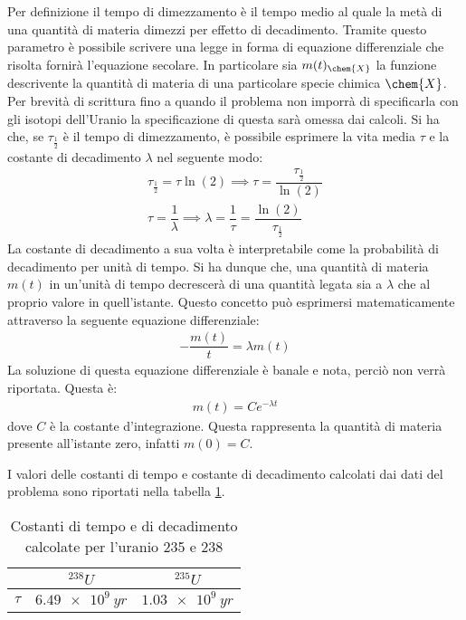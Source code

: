 \documentclass[../main.tex]{subfiles}
\begin{document}
\begin{svol}
		Per definizione il tempo di dimezzamento è il tempo medio al quale la metà di una quantità di materia dimezzi per effetto di decadimento. Tramite questo parametro è possibile scrivere una legge in forma di equazione differenziale che risolta fornirà l'equazione secolare. In particolare sia $ m(t)_{\chem{X}} $ la funzione descrivente la quantità di materia di una particolare specie chimica $ \chem{X} $. Per brevità di scrittura fino a quando il problema non imporrà di specificarla con gli isotopi dell'Uranio la specificazione di questa sarà omessa dai calcoli. Si ha che, se $ \tau_{\frac{1}{2}} $ è il tempo di dimezzamento, è possibile esprimere la vita media $ \tau $ e la costante di decadimento $ \lambda $ nel seguente modo:
		\begin{gather}
		\tau_{\frac{1}{2}}=\tau\ln(2) \implies \tau = \dfrac{\tau_{\frac{1}{2}}}{\ln(2)} \\
		\tau = \dfrac{1}{\lambda} \implies \lambda = \dfrac{1}{\tau}=\dfrac{\ln(2)}{\tau_{\frac{1}{2}}}
		\end{gather}
		La costante di decadimento a sua volta è interpretabile come la probabilità di decadimento per unità di tempo. Si ha dunque che, una quantità di materia $ m(t) $ in un'unità di tempo decrescerà di una quantità legata sia a $ \lambda $ che al proprio valore in quell'istante. Questo concetto può esprimersi matematicamente attraverso la seguente equazione differenziale:
		\begin{gather}
			-\dfrac{m(t)}{t}=\lambda m(t)
		\end{gather}
		La soluzione di questa equazione differenziale è banale e nota, perciò non verrà riportata. Questa è:
		\begin{gather}
			m(t)=Ce^{-\lambda t}
		\end{gather}
		dove $ C $ è la costante d'integrazione. Questa rappresenta la quantità di materia presente all'istante zero, infatti $ m(0)=C $.
		
		I valori delle costanti di tempo e costante di decadimento calcolati dai dati del problema sono riportati nella tabella \ref{tbl:decayValues}.
		
		\begin{table}[h]
			\centering
			\caption{Costanti di tempo e di decadimento calcolate per l'uranio 235 e 238}
			\label{tbl:decayValues}
			\vspace{1mm}
		\begin{tabular}{c|cc}
			 
			& $^{238}U$ & $^{235}U$ \\ 
			\hline 
			$\tau$ & $\SI{6.49e9}{yr}$ & $\SI{1.03e9}{yr}$ \\ 
			 

\end{tabular}
\end{table}
\end{svol}
\end{document}
